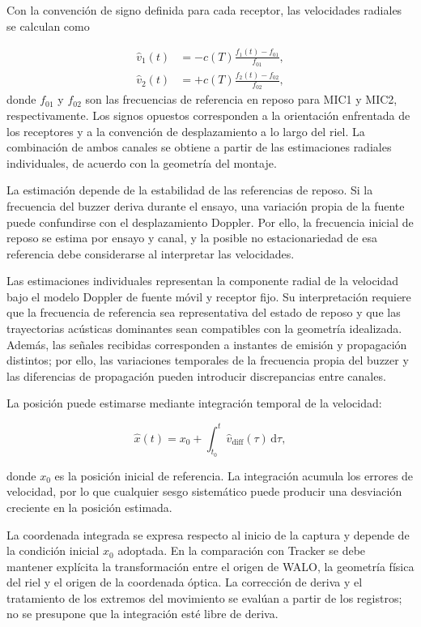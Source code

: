 Con la convención de signo definida para cada
receptor, las velocidades radiales se calculan como

\begin{align}
    \hat{v}_1(t)&=
    -c(T)\frac{f_1(t)-f_{01}}{f_{01}},
    \label{eq:velocidad_mic1_exp03}\\
    \hat{v}_2(t)&=
    +c(T)\frac{f_2(t)-f_{02}}{f_{02}},
    \label{eq:velocidad_mic2_exp03}
\end{align}
donde $f_{01}$ y $f_{02}$ son las frecuencias de
referencia en reposo para MIC1 y MIC2,
respectivamente. Los signos opuestos corresponden
a la orientación enfrentada de los receptores y
a la convención de desplazamiento a lo largo del
riel. La combinación de ambos canales se obtiene
a partir de las estimaciones radiales individuales,
de acuerdo con la geometría del montaje.

La estimación depende de la estabilidad de las
referencias de reposo. Si la frecuencia del buzzer
deriva durante el ensayo, una variación propia de
la fuente puede confundirse con el desplazamiento
Doppler. Por ello, la frecuencia inicial de reposo
se estima por ensayo y canal, y la posible
no estacionariedad de esa referencia debe
considerarse al interpretar las velocidades.

Las estimaciones individuales representan la
componente radial de la velocidad bajo el modelo
Doppler de fuente móvil y receptor fijo. Su
interpretación requiere que la frecuencia de
referencia sea representativa del estado de reposo
y que las trayectorias acústicas dominantes sean
compatibles con la geometría idealizada. Además,
las señales recibidas corresponden a instantes de
emisión y propagación distintos; por ello, las
variaciones temporales de la frecuencia propia
del buzzer y las diferencias de propagación pueden
introducir discrepancias entre canales.

La posición puede estimarse mediante integración
temporal de la velocidad:

\begin{equation}
    \hat{x}(t)=x_0+
    \int_{t_0}^{t}\hat{v}_{\mathrm{diff}}(\tau)
    \,\mathrm{d}\tau,
    \label{eq:posicion_integrada_exp03}
\end{equation}

donde $x_0$ es la posición inicial de referencia.
La integración acumula los errores de velocidad,
por lo que cualquier sesgo sistemático puede
producir una desviación creciente en la posición
estimada.

La coordenada integrada se expresa respecto al
inicio de la captura y depende de la condición
inicial $x_0$ adoptada. En la comparación con
Tracker se debe mantener explícita la transformación
entre el origen de WALO, la geometría física del
riel y el origen de la coordenada óptica. La
corrección de deriva y el tratamiento de los
extremos del movimiento se evalúan a partir de
los registros; no se presupone que la integración
esté libre de deriva.

